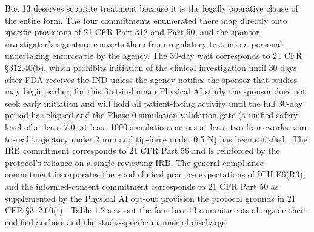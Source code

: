 
Box 13 deserves separate treatment because it is the legally operative
clause of the entire form. The four commitments enumerated there map
directly onto specific provisions of 21 CFR Part 312 and Part 50, and the
sponsor-investigator's signature converts them from regulatory text into a
personal undertaking enforceable by the agency. The 30-day wait
corresponds to 21 CFR \S 312.40(b), which prohibits initiation of the
clinical investigation until 30 days after FDA receives the IND unless the
agency notifies the sponsor that studies may begin earlier; for this
first-in-human Physical AI study the sponsor does not seek early
initiation and will hold all patient-facing activity until the full 30-day
period has elapsed and the Phase 0 simulation-validation gate (a unified
safety level of at least 7.0, at least 1000 simulations across at least
two frameworks, sim-to-real trajectory under 2 mm and tip-force under
0.5 N) has been satisfied \cite{cfr312paiuni, paipredict4x}. The IRB
commitment corresponds to 21 CFR Part 56 and is reinforced by the
protocol's reliance on a single reviewing IRB. The general-compliance
commitment incorporates the good clinical practice expectations of ICH
E6(R3), and the informed-consent commitment corresponds to 21 CFR Part 50
as supplemented by the Physical AI opt-out provision the protocol grounds
in 21 CFR \S 312.60(f) \cite{cfr050paiuni, ichpaistduni}. Table 1.2 sets
out the four box-13 commitments alongside their codified anchors and the
study-specific manner of discharge.

